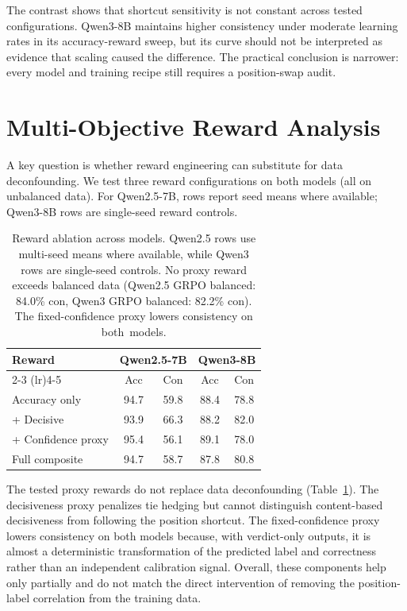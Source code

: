 \documentclass[letterpaper]{article}
\begin{document}
The contrast shows that shortcut sensitivity is not constant across tested configurations. Qwen3-8B maintains higher consistency under moderate learning rates in its accuracy-reward sweep, but its curve should not be interpreted as evidence that scaling caused the difference. The practical conclusion is narrower: every model and training recipe still requires a position-swap audit.

\section{Multi-Objective Reward Analysis}
\label{app:reward}

A key question is whether reward engineering can substitute for data deconfounding. We test three reward configurations on both models (all on unbalanced data). For Qwen2.5-7B, rows report seed means where available; Qwen3-8B rows are single-seed reward controls.

\begin{table}[H]
\centering
\footnotesize
\begin{tabular}{lcccc}
\toprule
\textbf{Reward} & \multicolumn{2}{c}{\textbf{Qwen2.5-7B}} & \multicolumn{2}{c}{\textbf{Qwen3-8B}} \\
\cmidrule(lr){2-3} \cmidrule(lr){4-5}
 & Acc & Con & Acc & Con \\
\midrule
Accuracy only & 94.7 & 59.8 & 88.4 & 78.8 \\
+ Decisive & 93.9 & 66.3 & 88.2 & 82.0 \\
+ Confidence proxy & 95.4 & 56.1 & 89.1 & 78.0 \\
Full composite & 94.7 & 58.7 & 87.8 & 80.8 \\
\bottomrule
\end{tabular}
\caption{Reward ablation across models. Qwen2.5 rows use multi-seed means where available, while Qwen3 rows are single-seed controls. No proxy reward exceeds balanced data (Qwen2.5 GRPO balanced: 84.0\% con, Qwen3 GRPO balanced: 82.2\% con). The fixed-confidence proxy lowers consistency on \mbox{both models}.}
\label{tab:reward_ablation}
\end{table}

The tested proxy rewards do not replace data deconfounding (Table~\ref{tab:reward_ablation}). The decisiveness proxy penalizes tie hedging but cannot distinguish content-based decisiveness from following the position shortcut. The fixed-confidence proxy lowers consistency on both models because, with verdict-only outputs, it is almost a deterministic transformation of the predicted label and correctness rather than an independent calibration signal. Overall, these components help only partially and do not match the direct intervention of removing the position-label correlation from the training data.
\end{document}

